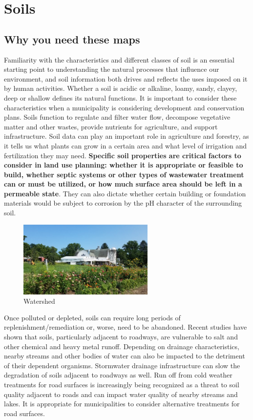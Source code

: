 \label{map:steepslopes}

\section{Soils}\label{subsec:soils}
\subsection*{Why you need these maps}
Familiarity with the characteristics and different classes of soil is an 
essential starting point to understanding the natural processes that influence 
our environment, and soil information both drives and reflects the uses imposed 
on it by human activities. Whether a soil is acidic or alkaline, loamy, sandy, 
clayey, deep or shallow defines its natural functions. It is important to 
consider these characteristics when a municipality is considering development 
and conservation plans. Soils function to regulate and filter water flow, 
decompose vegetative matter and other wastes, provide nutrients for agriculture, 
and support infrastructure. Soil data can play an important role in agriculture 
and forestry, as it tells us what plants can grow in a certain area and what 
level of irrigation and fertilization they may need. \textbf{Specific soil 
properties are critical factors to consider in land use planning: whether it is 
appropriate or feasible to build, whether septic systems or other types of 
wastewater treatment can or must be utilized, or how much surface area should be 
left in a permeable state}. They can also dictate whether certain building or 
foundation materials would be subject to corrosion by the pH character of the 
surrounding soil. 

\begin{figure}
    \includegraphics[width=0.6\textwidth]{images/asdasd.jpg}
  \caption{Watershed}
\end{figure}
Once polluted or depleted, soils can require long periods of 
replenishment/remediation or, worse, need to be abandoned. Recent studies have 
shown that soils, particularly adjacent to roadways, are vulnerable to salt and 
other chemical and heavy metal runoff. Depending on drainage characteristics, 
nearby streams and other bodies of water can also be impacted to the detriment 
of their dependent organisms. Stormwater drainage infrastructure can slow the 
degradation of soils adjacent to roadways as well. Run off from cold weather 
treatments for road surfaces is increasingly being recognized as a threat to 
soil quality adjacent to roads and can impact water quality of nearby streams 
and lakes. It is appropriate for municipalities to consider alternative 
treatments for road surfaces. 

